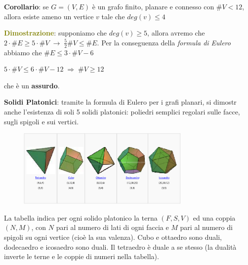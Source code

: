 \newpage
\begin{flushleft}
    \textbf{Corollario}: se $G = (V, E)$ è un grafo finito, planare e connesso con $\# V < 12$, allora esiste ameno un vertice $v$ tale che $deg(v) \leq 4$

    \begin{boxA}
        \textcolor{olive}{\textbf{Dimostrazione}}: supponiamo che $deg(v) \geq 5$, allora avremo che $2 \cdot \# E \geq 5 \cdot \# V \; \rightarrow \; \frac{5}{2} \# V \leq \# E$. Per la conseguenza della \textit{formula di Eulero} abbiamo che $\# E \leq 3 \cdot \# V - 6$ 

        {\centering
            $5 \cdot \# V \leq 6 \cdot \# V - 12 \; \Rightarrow \; \# V \geq 12$
        \par}
        che è un \textbf{assurdo}.
    \end{boxA}

    \textbf{Solidi Platonici}: tramite la formula di Eulero per i grafi planari, si dimostr anche l'esistenza di soli 5 solidi platonici: poliedri semplici regolari sulle facce, sugli spigoli e sui vertici.

    \begin{figure}[h]
        \centering
        \includegraphics[width=0.75\textwidth]{img/solidi_platonici}
    \end{figure}
    La tabella indica per ogni solido platonico la terna $(F, S, V)$ ed una coppia $(N, M)$, con $N$ pari al numero di lati di ogni faccia e $M$ pari al numero di spigoli su ogni vertice (cioè la sua valenza). Cubo e ottaedro sono duali, dodecaedro e icosaedro sono duali. Il tetraedro è duale a se stesso (la dualità inverte le terne e le coppie di numeri nella tabella).
\end{flushleft}

\newpage
